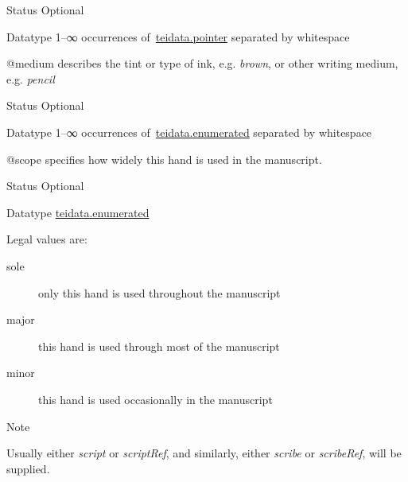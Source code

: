 \begin{reflist}
\begin{sansreflist}
\begin{reflist}
    \item[{Status}]
  Optional
    \item[{Datatype}]
  1–∞ occurrences of \hyperref[TEI.teidata.pointer]{teidata.pointer} separated by whitespace
\end{reflist}  
    \item[@medium]
  describes the tint or type of ink, e.g. \textit{brown}, or other writing medium, e.g. \textit{pencil}
\begin{reflist}
    \item[{Status}]
  Optional
    \item[{Datatype}]
  1–∞ occurrences of \hyperref[TEI.teidata.enumerated]{teidata.enumerated} separated by whitespace
\end{reflist}  
    \item[@scope]
  specifies how widely this hand is used in the manuscript.
\begin{reflist}
    \item[{Status}]
  Optional
    \item[{Datatype}]
  \hyperref[TEI.teidata.enumerated]{teidata.enumerated}
    \item[{Legal values are:}]
  \begin{description}

\item[{sole}]only this hand is used throughout the manuscript
\item[{major}]this hand is used through most of the manuscript
\item[{minor}]this hand is used occasionally in the manuscript
\end{description} 
\end{reflist}  
\end{sansreflist}  
    \item[{Note}]
  \par
Usually either {\itshape script} or {\itshape scriptRef}, and similarly, either {\itshape scribe} or {\itshape scribeRef}, will be supplied.
\end{reflist}  
